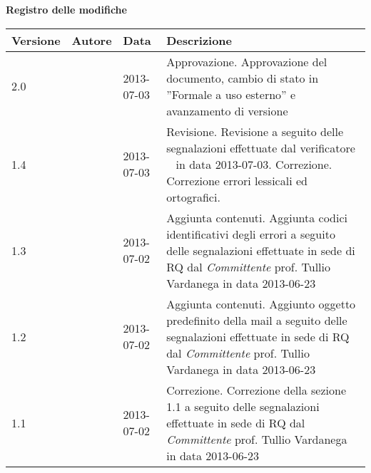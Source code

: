 \Large{\textbf{Registro delle modifiche}}\\
\normalsize

\label{tabVers}
\begin{longtable}{p{} p{} p{} p{}} 

\toprule
\textbf{Versione}	&	\textbf{Autore}	&	\textbf{Data}	&	\textbf{Descrizione}\\
\midrule
2.0	&	\DC &	2013-07-03 	&	Approvazione.\newline
						Approvazione del documento, cambio di stato in ”Formale a uso esterno” e avanzamento di versione\\
\midrule
1.4	&	\EZ &	2013-07-03 	&	Revisione.\newline
						Revisione a seguito delle segnalazioni effettuate dal verificatore \AB~ in data 2013-07-03.\newline
						Correzione.\newline
						Correzione errori lessicali ed ortografici.\\
\midrule
1.3	&	\EZ &	2013-07-02 	& Aggiunta contenuti. \newline Aggiunta codici identificativi degli errori a seguito delle segnalazioni effettuate in sede di RQ dal \emph{Committente} prof. Tullio Vardanega in data 2013-06-23\\
\midrule
1.2	&	\EZ &	2013-07-02 	&	Aggiunta contenuti. \newline Aggiunto oggetto predefinito della mail a seguito delle segnalazioni effettuate in sede di RQ dal \emph{Committente} prof. Tullio Vardanega in data 2013-06-23\\
\midrule
1.1	&	\EZ &	2013-07-02 	& Correzione. \newline Correzione della sezione 1.1 a seguito delle segnalazioni effettuate in sede di RQ dal \emph{Committente} prof. Tullio Vardanega in data 2013-06-23\\


\end{longtable}
